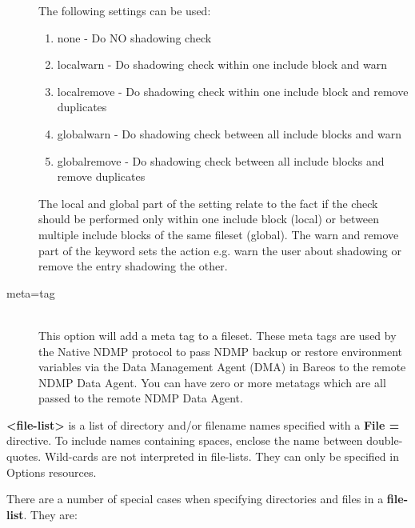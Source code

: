 \begin{description}
   The following settings can be used:

   \begin{enumerate}
   \item none - Do NO shadowing check
   \item localwarn - Do shadowing check within one include block and warn
   \item localremove - Do shadowing check within one include block and remove duplicates
   \item globalwarn - Do shadowing check between all include blocks and warn
   \item globalremove - Do shadowing check between all include blocks and remove duplicates
   \end{enumerate}

   The local and global part of the setting relate to the fact if the check
   should be performed only within one include block (local) or between multiple
   include blocks of the same fileset (global). The warn and remove part of the
   keyword sets the action e.g. warn the user about shadowing or remove
   the entry shadowing the other.

\item [meta=tag] \hfill \\
   This option will add a meta tag to a fileset. These meta tags are used
   by the Native NDMP protocol to pass NDMP backup or restore environment
   variables via the Data Management Agent (DMA) in Bareos to the remote
   NDMP Data Agent. You can have zero or more metatags which are all passed
   to the remote NDMP Data Agent.

\end{description}

{\bf {\textless}file-list{\textgreater}} is a list of directory and/or filename names
specified with a {\bf File =} directive. To include names containing spaces,
enclose the name between double-quotes. Wild-cards are not interpreted
in file-lists. They can only be specified in Options resources.

There are a number of special cases when specifying directories and files in a
{\bf file-list}. They are:

